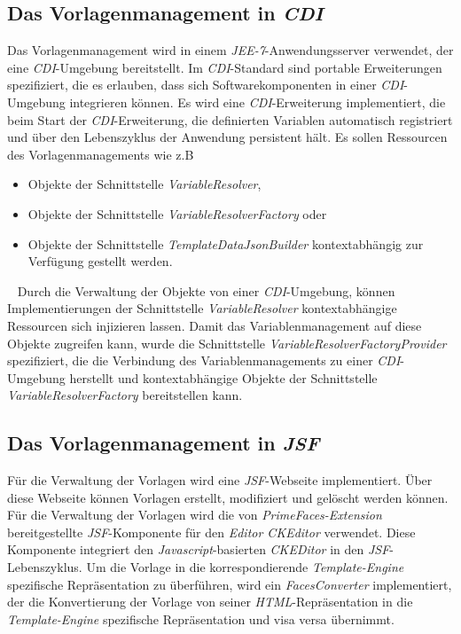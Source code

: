 \subsection{Das Vorlagenmanagement in \emph{CDI}}
\label{sec:sub-template-management-cdi}
Das Vorlagenmanagement wird in einem \emph{JEE-7}-Anwendungsserver verwendet, der eine \emph{CDI}-Umgebung bereitstellt. Im \emph{CDI}-Standard sind portable Erweiterungen  spezifiziert, die es erlauben, dass sich Softwarekomponenten in einer \emph{CDI}-Umgebung integrieren können. Es wird eine \emph{CDI}-Erweiterung implementiert, die beim Start der \emph{CDI}-Erweiterung, die definierten Variablen automatisch registriert und über den Lebenszyklus der Anwendung persistent hält. Es sollen Ressourcen des Vorlagenmanagements wie z.B
\begin{itemize}
	\item Objekte der Schnittstelle \emph{VariableResolver},
	\item Objekte der Schnittstelle \emph{VariableResolverFactory} oder
	\item Objekte der Schnittstelle \emph{TemplateDataJsonBuilder} kontextabhängig zur Verfügung gestellt werden.
\end{itemize}
\ \newline
Durch die Verwaltung der Objekte von einer \emph{CDI}-Umgebung, können Implementierungen der Schnittstelle \emph{VariableResolver} kontextabhängige Ressourcen sich injizieren lassen. Damit das Variablenmanagement auf diese Objekte zugreifen kann, wurde die Schnittstelle \emph{VariableResolverFactoryProvider} spezifiziert, die die Verbindung des Variablenmanagements zu einer \emph{CDI}-Umgebung herstellt und kontextabhängige Objekte der Schnittstelle \emph{VariableResolverFactory} bereitstellen kann.

\subsection{Das Vorlagenmanagement in \emph{JSF}}
Für die Verwaltung der Vorlagen wird eine \emph{JSF}-Webseite implementiert. Über diese Webseite können Vorlagen erstellt, modifiziert und gelöscht werden können. Für die Verwaltung der Vorlagen wird die von \emph{PrimeFaces-Extension} bereitgestellte \emph{JSF}-Komponente für den \emph{Editor CKEditor} verwendet. Diese Komponente integriert den \emph{Javascript}-basierten \emph{CKEDitor} in den \emph{JSF}-Lebenszyklus. Um die Vorlage in die korrespondierende \emph{Template-Engine} spezifische Repräsentation zu überführen, wird ein \emph{FacesConverter} implementiert, der die Konvertierung der Vorlage von seiner \emph{HTML}-Repräsentation in die \emph{Template-Engine} spezifische Repräsentation und visa versa übernimmt.

